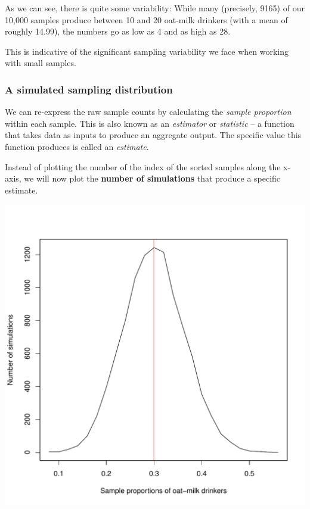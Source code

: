 \documentclass[
  11pt,
]{article}
\begin{document}
As we can see, there is quite some variability: While many (precisely, 9165) of our 10,000 samples produce between 10 and 20 oat-milk drinkers (with a mean of roughly 14.99), the numbers go as low as 4 and as high as 28.

This is indicative of the significant sampling variability we face when working with small samples.

\hypertarget{a-simulated-sampling-distribution}{%
\subsubsection{A simulated sampling distribution}\label{a-simulated-sampling-distribution}}

We can re-express the raw sample counts by calculating the \emph{sample proportion} within each sample. This is also known as an \emph{estimator} or \emph{statistic} -- a function that takes data as inputs to produce an aggregate output. The specific value this function produces is called an \emph{estimate}.

Instead of plotting the number of the index of the sorted samples along the x-axis, we will now plot the \textbf{number of simulations} that produce a specific estimate.

\begin{center}\includegraphics{01-01-lec_files/figure-latex/sampling-dist-1} \end{center}
\end{document}
